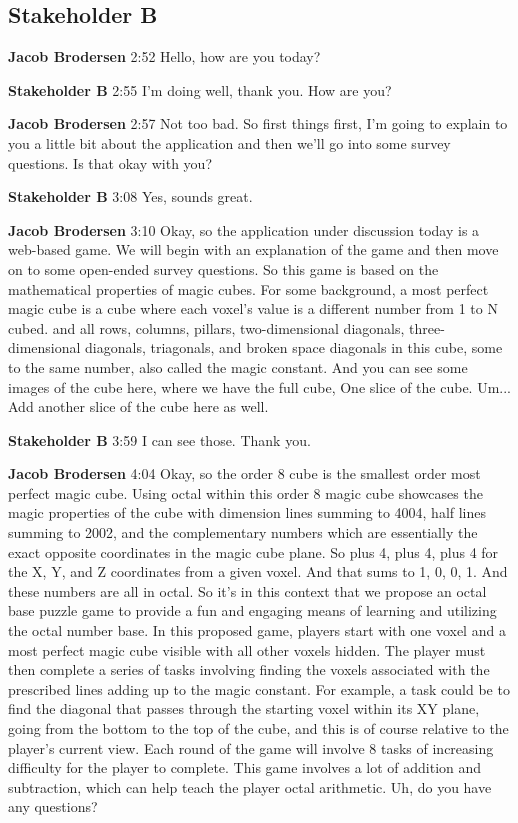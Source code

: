 \documentclass{article}
\begin{document}
\subsection{Stakeholder B}

\noindent \textbf{Jacob Brodersen}   2:52
Hello, how are you today?

\noindent \textbf{Stakeholder B}   2:55
I'm doing well, thank you. How are you?

\noindent \textbf{Jacob Brodersen}   2:57
Not too bad. So first things first, I'm going to explain to you a little bit about the application and then we'll go into some survey questions. Is that okay with you?

\noindent \textbf{Stakeholder B}   3:08
Yes, sounds great.

\noindent \textbf{Jacob Brodersen}   3:10
Okay, so the application under discussion today is a web-based game. We will begin with an explanation of the game and then move on to some open-ended survey questions. So this game is based on the mathematical properties of magic cubes. For some background, a most perfect magic cube is a cube where each voxel's value is a different number from 1 to N cubed.
and all rows, columns, pillars, two-dimensional diagonals, three-dimensional diagonals, triagonals, and broken space diagonals in this cube, some to the same number, also called the magic constant. And you can see some images of the cube here, where we have the full cube,
One slice of the cube.
Um...
Add another slice of the cube here as well.

\noindent \textbf{Stakeholder B}   3:59
I can see those. Thank you.

\noindent \textbf{Jacob Brodersen}   4:04
Okay, so the order 8 cube is the smallest order most perfect magic cube. Using octal within this order 8 magic cube showcases the magic properties of the cube with dimension lines summing to 4004, half lines summing to 2002, and the complementary numbers which are
essentially the exact opposite coordinates in the magic cube plane. So plus 4, plus 4, plus 4 for the X, Y, and Z coordinates from a given voxel. And that sums to 1, 0, 0, 1. And these numbers are all in octal. So it's in this context that we propose an octal base
puzzle game to provide a fun and engaging means of learning and utilizing the octal number base. In this proposed game, players start with one voxel and a most perfect magic cube visible with all other voxels hidden. The player must then complete a series of tasks involving finding the voxels associated with the prescribed lines adding up to the magic constant.
For example, a task could be to find the diagonal that passes through the starting voxel within its XY plane, going from the bottom to the top of the cube, and this is of course relative to the player's current view.
Each round of the game will involve 8 tasks of increasing difficulty for the player to complete. This game involves a lot of addition and subtraction, which can help teach the player octal arithmetic.
Uh, do you have any questions?
\end{document}
